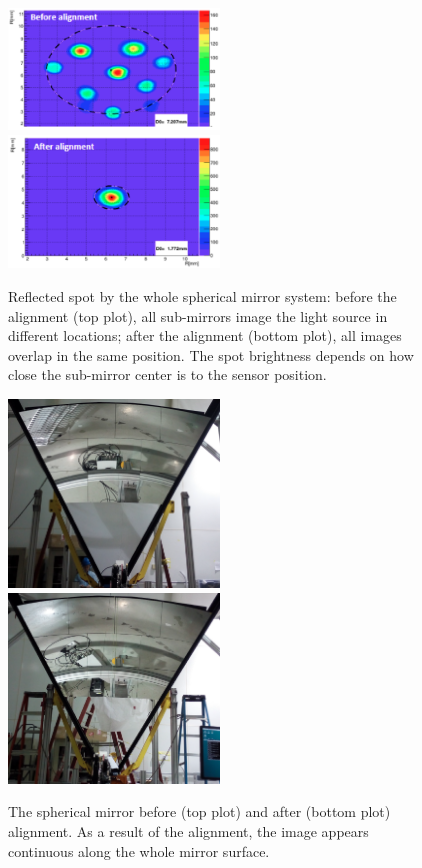 \documentclass[5p,times,twocolumn]{elsarticle}
\begin{document}
\begin{figure}
\begin{center}
\includegraphics[width=0.50\textwidth]{mirror_spot1.png}
\includegraphics[width=0.50\textwidth]{mirror_spot2.png}
\caption{Reflected spot by the whole spherical mirror system: before the alignment (top plot), all sub-mirrors
  image the light source in different locations; after the alignment (bottom plot), all images overlap in the same
  position. The spot brightness depends on how close the sub-mirror center is to the sensor position.}
\label{fig:MirSpots}
\end{center}
\end{figure}

\begin{figure}
\begin{center}
\includegraphics[width=0.50\textwidth]{mirror_before.png}
\includegraphics[width=0.50\textwidth]{mirror_after.png}
\caption{The spherical mirror before (top plot) and after (bottom plot) alignment. As a result of the alignment, the image
  appears continuous along the whole mirror surface.}
\label{fig:MirAlign}
\end{center}
\end{figure}
\end{document}
